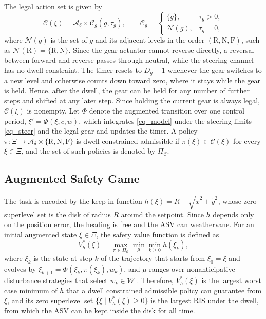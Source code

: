 \documentclass[lettersize,journal]{IEEEtran}
\newcommand{\calA}{\mathcal{A}}
\newcommand{\calC}{\mathcal{C}}
\newcommand{\calW}{\mathcal{W}}
\newcommand{\calN}{\mathcal{N}}
\newcommand{\gR}{\mathrm{R}}
\newcommand{\gN}{\mathrm{N}}
\newcommand{\gF}{\mathrm{F}}
\begin{document}
The legal action set is given by
\begin{equation}
\calC(\xi) = \calA_\delta \times \calC_g(g, \tau_g), \qquad
\calC_g = \begin{cases} \{g\}, & \tau_g > 0,\\ \calN(g), & \tau_g = 0, \end{cases}
\label{eq_legal}
\end{equation}
where $\calN(g)$ is the set of $g$ and its adjacent levels in the order $(\gR, \gN, \gF)$, such as $\calN(\gR) = \{\gR, \gN\}$. Since the gear actuator cannot reverse directly, a reversal between forward and reverse passes through neutral, while the steering channel has no dwell constraint. The timer resets to $D_g - 1$ whenever the gear switches to a new level and otherwise counts down toward zero, where it stays while the gear is held. Hence, after the dwell, the gear can be held for any number of further steps and shifted at any later step. Since holding the current gear is always legal, $\calC(\xi)$ is nonempty. Let $\Phi$ denote the augmented transition over one control period, $\xi' = \Phi(\xi, c, w)$, which integrates \eqref{eq_model} under the steering limits \eqref{eq_steer} and the legal gear and updates the timer. A policy $\pi \colon \Xi \to \calA_\delta \times \{\gR, \gN, \gF\}$ is dwell constrained admissible if $\pi(\xi) \in \calC(\xi)$ for every $\xi \in \Xi$, and the set of such policies is denoted by $\Pi_{\calC}$.


\subsection{Augmented Safety Game}\label{sec_game}

The task is encoded by the keep in function $h(\xi) = R - \sqrt{\tilde{x}^2 + \tilde{y}^2}$, whose zero superlevel set is the disk of radius $R$ around the setpoint. Since $h$ depends only on the position error, the heading is free and the ASV can weathervane. For an initial augmented state $\xi \in \Xi$, the safety value function is defined as
\begin{equation}
V_h^{*}(\xi) = \max_{\pi \in \Pi_{\calC}} \min_{\mu} \min_{k \ge 0} h(\xi_k),
\label{eq_value}
\end{equation}
where $\xi_k$ is the state at step $k$ of the trajectory that starts from $\xi_0 = \xi$ and evolves by $\xi_{k+1} = \Phi(\xi_k, \pi(\xi_k), w_k)$, and $\mu$ ranges over nonanticipative disturbance strategies that select $w_k \in \calW$ \cite{bansal2017}. Therefore, $V_h^{*}(\xi)$ is the largest worst case minimum of $h$ that a dwell constrained admissible policy can guarantee from $\xi$, and its zero superlevel set $\{\xi \mid V_h^{*}(\xi) \ge 0\}$ is the largest RIS under the dwell, from which the ASV can be kept inside the disk for all time.
\end{document}
